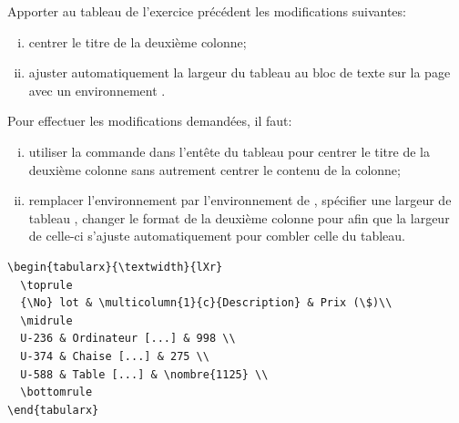 \begin{exercice}
  Apporter au tableau de l'exercice précédent les modifications
  suivantes:
  \begin{enumerate}[i)]
  \item centrer le titre de la deuxième colonne;
  \item ajuster automatiquement la largeur du tableau au bloc de texte
    sur la page avec un environnement .
  \end{enumerate}
  \begin{sol}
    Pour effectuer les modifications demandées, il faut:
    \begin{enumerate}[i)]
    \item utiliser la commande \cmd{\multicolumn} dans l'entête du
      tableau pour centrer le titre de la deuxième colonne sans
      autrement centrer le contenu de la colonne;
    \item remplacer l'environnement  par l'environnement
       de , spécifier une largeur de
      tableau , changer le format de la deuxième colonne
      pour  afin que la largeur de celle-ci s'ajuste
      automatiquement pour combler celle du tableau.
    \end{enumerate}
\begin{lstlisting}
\begin{tabularx}{\textwidth}{lXr}
  \toprule
  {\No} lot & \multicolumn{1}{c}{Description} & Prix (\$)\\
  \midrule
  U-236 & Ordinateur [...] & 998 \\
  U-374 & Chaise [...] & 275 \\
  U-588 & Table [...] & \nombre{1125} \\
  \bottomrule
\end{tabularx}
\end{lstlisting}
  \end{sol}
\end{exercice}

